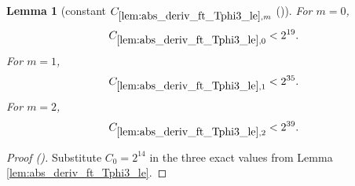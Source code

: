 \documentclass[12pt,reqno]{amsart}
\newcommand{\auto}{{({\tiny\faCar})}}
\theoremstyle{plain}
\newtheorem{lemma}[theorem]{Lemma}
\numberwithin{equation}{section}
\theoremstyle{remark}
\newcommand{\using}[1]{}
\begin{document}
\begin{lemma}[constant $C_{\ref{lem:abs_deriv_ft_Tphi3_le},m}$ \auto]\label{constant T phi three derivative}\using{lem:abs_deriv_ft_Tphi3_le}
For $m=0$,
\begin{equation}\label{constant T phi three derivative bound}
C_{\ref{lem:abs_deriv_ft_Tphi3_le},0}<2^{19}.
\end{equation}
For $m=1$,
\begin{equation}\label{auto:constant-T-phi-three-derivative-one}
C_{\ref{lem:abs_deriv_ft_Tphi3_le},1}<2^{35}.
\end{equation}
For $m=2$,
\begin{equation}\label{auto:constant-T-phi-three-derivative-two}
C_{\ref{lem:abs_deriv_ft_Tphi3_le},2}<2^{39}.
\end{equation}
\end{lemma}
\begin{proof}[Proof \auto]
Substitute $C_0=2^{14}$ in the three exact values from Lemma \ref{lem:abs_deriv_ft_Tphi3_le}.
\end{proof}
\end{document}
